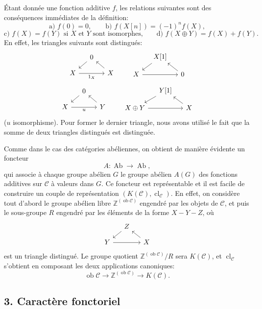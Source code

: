 \documentclass[11pt]{article}
\providecommand{\Ob}{\operatorname{ob}}
\providecommand{\cC}{\mathcal C}
\providecommand{\Ob}{\operatorname{ob}}
\providecommand{\Ab}{\operatorname{Ab}}
\providecommand{\cC}{\mathcal C}
\providecommand{\Ab}{\operatorname{Ab}}
\providecommand{\Ob}{\operatorname{Ob}}
\providecommand{\Ob}{\operatorname{ob}}
\providecommand{\Ob}{\operatorname{Ob}}
\begin{document}
Étant donnée une fonction additive $f$, les relations suivantes sont des conséquences immédiates de la définition:
\[
\text{a) } f(0)=0,\qquad
\text{b) } f(X[n])=(-1)^n f(X),
\]
\[
\text{c) } f(X)=f(Y)\text{ si }X\text{ et }Y\text{ sont isomorphes,}
\qquad
\text{d) } f(X\oplus Y)=f(X)+f(Y).
\]
En effet, les triangles suivants sont distingués:
\[
\begin{tikzcd}[column sep=small,row sep=small]
&0 \arrow[dl]\\ X \arrow[rr,"1_X"']&&X\arrow[ul]
\end{tikzcd}
\qquad
\begin{tikzcd}[column sep=small,row sep=small]
&X[1]\arrow[dl]\\ X\arrow[rr]&&0\arrow[ul]
\end{tikzcd}
\]
\[
\begin{tikzcd}[column sep=small,row sep=small]
&0\arrow[dl]\\ X\arrow[rr,"u"']&&Y\arrow[ul]
\end{tikzcd}
\qquad
\begin{tikzcd}[column sep=small,row sep=small]
&Y[1]\arrow[dl]\\ X\oplus Y\arrow[rr]&&X\arrow[ul]
\end{tikzcd}
\]
($u$ isomorphisme). Pour former le dernier triangle, nous avons utilisé le fait que la somme de deux triangles distingués est distinguée.

Comme dans le cas des catégories abéliennes, on obtient de manière évidente un foncteur
\[
A:\Ab\longrightarrow\Ab,
\]
qui associe à chaque groupe abélien $G$ le groupe abélien $A(G)$ des fonctions additives sur $\cC$ à valeurs dans $G$. Ce foncteur est représentable et il est facile de construire un couple de représentation $(K(\cC),\operatorname{cl}_{\cC})$. En effet, on considère tout d'abord le groupe abélien libre $\mathbb Z^{(\Ob\cC)}$ engendré par les objets de $\cC$, et puis le sous-groupe $R$ engendré par les éléments de la forme $X-Y-Z$, où
\[
\begin{tikzcd}[column sep=small,row sep=small]
&Z\arrow[dl]\\ Y\arrow[rr]&&X\arrow[ul]
\end{tikzcd}
\]
est un triangle distingué. Le groupe quotient $\mathbb Z^{(\Ob\cC)}/R$ sera $K(\cC)$, et $\operatorname{cl}_{\cC}$ s'obtient en composant les deux applications canoniques:
\[
\Ob\cC\longrightarrow \mathbb Z^{(\Ob\cC)}\longrightarrow K(\cC).
\]

\subsection*{3. Caractère fonctoriel}
\end{document}
